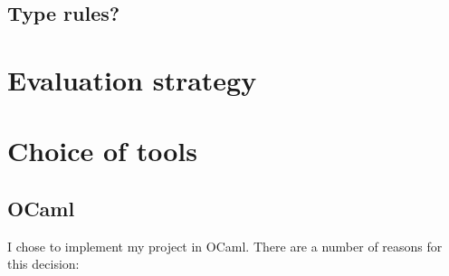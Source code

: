 \documentclass[12pt,a4paper]{report}
\begin{document}
\subsection{Type rules?}

\section{Evaluation strategy}

\section{Choice of tools}



\subsection{OCaml}
I chose to implement my project in OCaml. There are a number of reasons for this decision:




\end{document}
